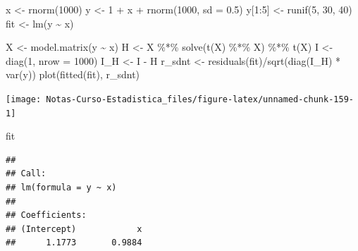 \documentclass[
  12pt,
]{book}
\newenvironment{Shaded}{\begin{snugshade}}{\end{snugshade}}
\newcommand{\AttributeTok}[1]{\textcolor[rgb]{0.77,0.63,0.00}{#1}}
\newcommand{\DecValTok}[1]{\textcolor[rgb]{0.00,0.00,0.81}{#1}}
\newcommand{\FloatTok}[1]{\textcolor[rgb]{0.00,0.00,0.81}{#1}}
\newcommand{\FunctionTok}[1]{\textcolor[rgb]{0.00,0.00,0.00}{#1}}
\newcommand{\NormalTok}[1]{#1}
\newcommand{\OtherTok}[1]{\textcolor[rgb]{0.56,0.35,0.01}{#1}}
\newcommand{\SpecialCharTok}[1]{\textcolor[rgb]{0.00,0.00,0.00}{#1}}
\theoremstyle{definition}
\theoremstyle{definition}
\theoremstyle{definition}
\theoremstyle{definition}
\theoremstyle{remark}
\begin{document}
\begin{Shaded}
\begin{Highlighting}[]
\NormalTok{x }\OtherTok{\textless{}{-}} \FunctionTok{rnorm}\NormalTok{(}\DecValTok{1000}\NormalTok{)}
\NormalTok{y }\OtherTok{\textless{}{-}} \DecValTok{1} \SpecialCharTok{+}\NormalTok{ x }\SpecialCharTok{+} \FunctionTok{rnorm}\NormalTok{(}\DecValTok{1000}\NormalTok{, }\AttributeTok{sd =} \FloatTok{0.5}\NormalTok{)}
\NormalTok{y[}\DecValTok{1}\SpecialCharTok{:}\DecValTok{5}\NormalTok{] }\OtherTok{\textless{}{-}} \FunctionTok{runif}\NormalTok{(}\DecValTok{5}\NormalTok{, }\DecValTok{30}\NormalTok{, }\DecValTok{40}\NormalTok{)}
\NormalTok{fit }\OtherTok{\textless{}{-}} \FunctionTok{lm}\NormalTok{(y }\SpecialCharTok{\textasciitilde{}}\NormalTok{ x)}

\NormalTok{X }\OtherTok{\textless{}{-}} \FunctionTok{model.matrix}\NormalTok{(y }\SpecialCharTok{\textasciitilde{}}\NormalTok{ x)}
\NormalTok{H }\OtherTok{\textless{}{-}}\NormalTok{ X }\SpecialCharTok{\%*\%} \FunctionTok{solve}\NormalTok{(}\FunctionTok{t}\NormalTok{(X) }\SpecialCharTok{\%*\%}\NormalTok{ X) }\SpecialCharTok{\%*\%} \FunctionTok{t}\NormalTok{(X)}
\NormalTok{I }\OtherTok{\textless{}{-}} \FunctionTok{diag}\NormalTok{(}\DecValTok{1}\NormalTok{, }\AttributeTok{nrow =} \DecValTok{1000}\NormalTok{)}
\NormalTok{I\_H }\OtherTok{\textless{}{-}}\NormalTok{ I }\SpecialCharTok{{-}}\NormalTok{ H}
\NormalTok{r\_sdnt }\OtherTok{\textless{}{-}} \FunctionTok{residuals}\NormalTok{(fit)}\SpecialCharTok{/}\FunctionTok{sqrt}\NormalTok{(}\FunctionTok{diag}\NormalTok{(I\_H) }\SpecialCharTok{*} \FunctionTok{var}\NormalTok{(y))}
\FunctionTok{plot}\NormalTok{(}\FunctionTok{fitted}\NormalTok{(fit), r\_sdnt)}
\end{Highlighting}
\end{Shaded}

\begin{center}\texttt{[image: Notas-Curso-Estadistica\_files/figure-latex/unnamed-chunk-159-1]} \end{center}

\begin{Shaded}
\begin{Highlighting}[]
\NormalTok{fit}
\end{Highlighting}
\end{Shaded}

\begin{verbatim}
## 
## Call:
## lm(formula = y ~ x)
## 
## Coefficients:
## (Intercept)            x  
##      1.1773       0.9884
\end{verbatim}
\end{document}
